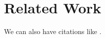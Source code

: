 \chapter{Related Work}
\label{chapter:related-work}


We can also have citations like \cite{iso-odf}.